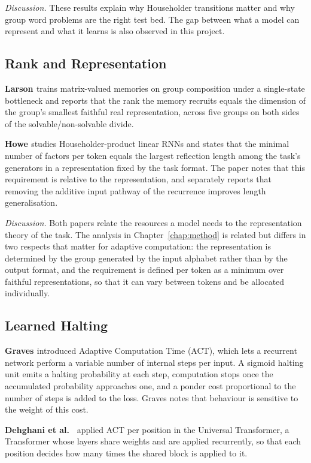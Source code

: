 \textit{Discussion.} These results explain why Householder transitions matter and why group word problems are the right test bed. The gap between what a model can represent and what it learns is also observed in this project.

\subsection{Rank and Representation}
\textbf{Larson \cite{larson}} trains matrix-valued memories on group composition under a single-state bottleneck and reports that the rank the memory recruits equals the dimension of the group's smallest faithful real representation, across five groups on both sides of the solvable/non-solvable divide.

\textbf{Howe \cite{howe}} studies Householder-product linear RNNs and states that the minimal number of factors per token equals the largest reflection length among the task's generators in a representation fixed by the task format. The paper notes that this requirement is relative to the representation, and separately reports that removing the additive input pathway of the recurrence improves length generalisation.

\textit{Discussion.} Both papers relate the resources a model needs to the representation theory of the task. The analysis in Chapter~\ref{chap:method} is related but differs in two respects that matter for adaptive computation: the representation is determined by the group generated by the input alphabet rather than by the output format, and the requirement is defined per token as a minimum over faithful representations, so that it can vary between tokens and be allocated individually.

\subsection{Learned Halting}
\textbf{Graves \cite{act}} introduced Adaptive Computation Time (ACT), which lets a recurrent network perform a variable number of internal steps per input. A sigmoid halting unit emits a halting probability at each step, computation stops once the accumulated probability approaches one, and a ponder cost proportional to the number of steps is added to the loss. Graves notes that behaviour is sensitive to the weight of this cost.

\textbf{Dehghani et al.\ \cite{universaltransformer}} applied ACT per position in the Universal Transformer, a Transformer whose layers share weights and are applied recurrently, so that each position decides how many times the shared block is applied to it.

